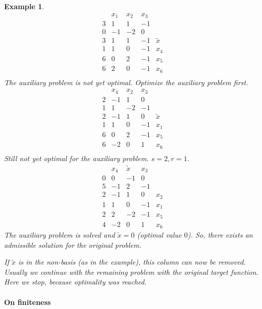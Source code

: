 \documentclass{article}
\numberwithin{lecref}{section}
\newtheorem*{Example}{Example}
\begin{document}
\begin{Example}
	\[
		\begin{array}{c|cccr}
			  & x_1 & x_2 & x_3 & \\
			3 & 1 & 1 & -1 & \\
			0 & -1 & -2 & 0 & \\
		\hline
			3 & 1 & 1 & -1 & \tilde x \\
			1 & 1 & 0 & -1 & x_4 \\
			6 & 0 & 2 & -1 & x_5 \\
			6 & 2 & 0 & -1 & x_6 \\
		\end{array}
	\]
	The auxiliary problem is not yet optimal.
	Optimize the auxiliary problem first.
	\[
		\begin{array}{c|cccr}
			  & x_4 & x_2 & x_3 & \\
			2 & -1  & 1 & 0 & \\
			1 & 1 & -2 & -1 & \\
		\hline
			2 & -1 & 1 & 0 & \tilde x \\
			1 & 1 & 0 & -1 & x_1 \\
			6 & 0 & 2 & -1 & x_5 \\
			6 & -2 & 0 & 1 & x_6 \\
		\end{array}
	\]
	Still not yet optimal for the auxiliary problem.
	$s = 2, r = 1$.
	\[
		\begin{array}{c|cccr}
			  & x_4 & \tilde x & x_3 & \\
			0 & 0 & -1 & 0 & \\
			5 & -1 & 2 & -1 & \\
		\hline
			2 & -1 & 1 & 0 & x_2 \\
			1 & 1 & 0 & -1 & x_1 \\
			2 & 2 & -2 & -1 & x_5 \\
			4 & -2 & 0 & 1 & x_6
		\end{array}
	\]
	The auxiliary problem is solved and $\tilde x = 0$ (optimal value $0$).
	So, there exists an admissible solution for the original problem.

	If $\tilde x$ is in the non-basis (as in the example), this column can now be removed.
	Usually we continue with the remaining problem with the original target function.
	Here we stop, because optimality was reached.
\end{Example}

\paragraph{On finiteness}
\end{document}
